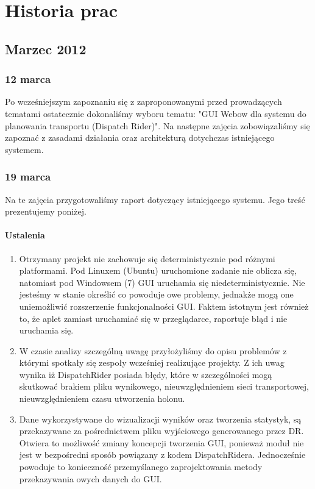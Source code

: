 \chapter{Historia prac}
\section{Marzec 2012}

\subsection{12 marca}
Po wcześniejszym zapoznaniu się z zaproponowanymi przed prowadzących tematami ostatecznie
dokonaliśmy wyboru tematu: "GUI Webow dla systemu do planowania transportu (Dispatch Rider)".
Na następne zajęcia zobowiązaliśmy się zapoznać z zasadami działania oraz architekturą dotychczas istniejącego systemem.

\subsection{19 marca}
Na te zajęcia przygotowaliśmy raport dotyczący istniejącego systemu. Jego treść prezentujemy poniżej.
\subsubsection{Ustalenia}
\begin{enumerate}
\item Otrzymany projekt nie zachowuje się deterministycznie pod różnymi platformami. Pod Linuxem (Ubuntu) uruchomione zadanie nie oblicza się, natomiast pod Windowsem (7) GUI uruchamia się niedeterministycznie. Nie jesteśmy w stanie określić co powoduje owe problemy, jednakże mogą one uniemożliwić rozszerzenie funkcjonalności GUI. Faktem istotnym jest również to, że aplet zamiast uruchamiać się w przeglądarce, raportuje błąd i nie uruchamia się.
\item W czasie analizy szczególną uwagę przyłożyliśmy do opisu problemów z którymi spotkały się zespoły wcześniej realizujące projekty. Z ich uwag wynika iż DispatchRider posiada błędy, które w szczególności mogą skutkować brakiem pliku wynikowego, nieuwzględnieniem sieci transportowej, nieuwzględnieniem czasu utworzenia holonu.
\item Dane wykorzystywane do wizualizacji wyników oraz tworzenia statystyk, są przekazywane za pośrednictwem pliku wyjściowego generowanego przez DR. Otwiera to możliwość zmiany koncepcji tworzenia GUI, ponieważ moduł nie jest w bezpośredni sposób powiązany z kodem DispatchRidera. Jednocześnie powoduje to konieczność przemyślanego zaprojektowania metody przekazywania owych danych do GUI.
\end{enumerate}
